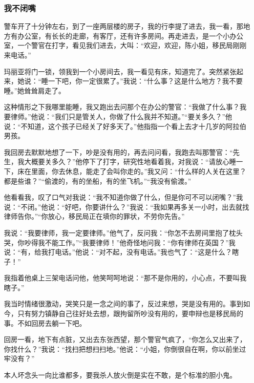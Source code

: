 \subsubsection*{我不闭嘴}
\par 警车开了十分钟左右，到了一座两层楼的房子，我的行李提了进去，我一看，那地方有办公室，有长长的走廊，有客厅，还有许多房间。再走进去，是一个小办公室，一个警官在打字，看见我们进去，大叫：“欢迎，欢迎，陈小姐，移民局刚刚来电话。”
\par 玛丽亚将门一锁，领我到一个小房间去，我一看见有床，知道完了。突然紧张起来，她说：“睡一下吧，你一定很累了。”我说：“什么事？这是什么地方？我不要睡。”她耸耸肩走了。
\par 这种情形之下我哪里能睡，我又跑出去问那个在办公的警官：“我做了什么事？我要律师。”他说：“我们只是管关人，你做了什么我并不知道。”“要关多久？”他说：“不知道，这个孩子已经关了好多天了。”他指指一个看上去才十几岁的阿拉伯男孩。
\par 我回房去默默地想了一下，吵是没有用的，再去问问看，我跑去叫那警官：“先生，我大概要关多久？”他停下了打字，研究性地看着我，对我说：“请放心睡一下，床在里面，你去休息，能走了会叫你走的。”我又问：“什么样的人关在这里？都是些谁？”“偷渡的，有的坐船，有的坐飞机。”“我没有偷渡。”
\par 他看看我，叹了口气对我说：“我不知道你做了什么，但是你可不可以闭嘴？”我说：“不闭。”他说：“好吧，你要讲什么？”我说：“我如果再多关一小时，出去就找律师告你。”“你放心，移民局正在填你的罪状，不劳你先告。”
\par 我说：“我要律师，我一定要律师。”他气了，反问我：“你怎不去房间里抱了枕头哭，你吵得我不能工作。”“我要律师！”他奇怪地问我：“你有律师在英国？”我说：“有，给我打电话。”他说：“对不起，没有电话。”我也气了：“这是什么？瞎子！”
\par 我指着他桌上三架电话问他，他笑呵呵地说：“那不是你用的，小心点，不要叫我瞎子。”
\par 我当时情绪很激动，哭笑只是一念之间的事了，反过来想，哭是没有用的。事到如今，只有努力镇静自己往好处去想，跟拘留所吵没有用的，要申辩也是移民局的事。不如回房去躺一下吧。
\par 回房一看，地下有点脏，又出去东张西望，那个警官气疯了，“你怎么又出来了，你找什么？”我说：“找扫把想扫扫地。”他说：“小姐，你倒很自在啊，你以前坐过牢没有？”
\par 本人坏念头一向比谁都多，要我杀人放火倒是实在不敢，是个标准的胆小鬼。
